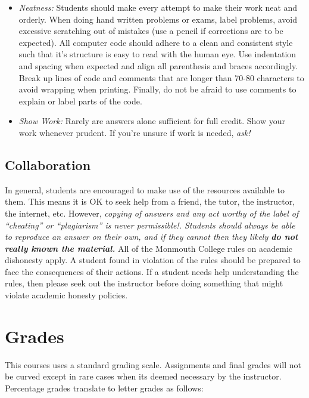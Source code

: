 \documentclass[10pt]{article}
\begin{document}
\begin{itemize}
\begin{itemize}
\item \textit{Neatness:}  Students should make every attempt to make their work neat and orderly. When doing hand written problems or exams, label problems, avoid excessive scratching out of mistakes (use a pencil if corrections are to be expected). All computer code should adhere to a clean and consistent style such that it's structure is easy to read with the human eye. Use indentation and spacing when expected and align all parenthesis and braces accordingly. Break up lines of code and comments that are longer than 70-80 characters to avoid wrapping when printing. Finally, do not be afraid to use comments to explain or label parts of the code. 

\item \textit{Show Work:} Rarely are answers alone sufficient for full credit.  Show your work whenever prudent.  If you're unsure if work is needed, \textit{ask!}
\end{itemize}

\end{itemize}


\subsection{Collaboration}

In general, students are encouraged to make use of the resources available to them.  This means it is OK to seek help from a friend, the tutor, the instructor, the internet, etc.  However, \textit{copying of answers and any act worthy of the label of ``cheating'' or ``plagiarism'' is never permissible!. Students should always be able to reproduce an answer on their own, and if they cannot then they likely \textbf{do not really known the material.}} All of the Monmouth College rules on academic dishonesty apply.  A student found in violation of the rules should be prepared to face the consequences of their actions. If a student needs help understanding the rules, then please seek out the instructor before doing something that might violate academic honesty policies.  

\section{Grades}

This courses uses a standard grading scale.  Assignments and final grades will not be curved except in rare cases when its deemed necessary by the instructor.  Percentage grades translate to letter grades as follows:
\end{document}
